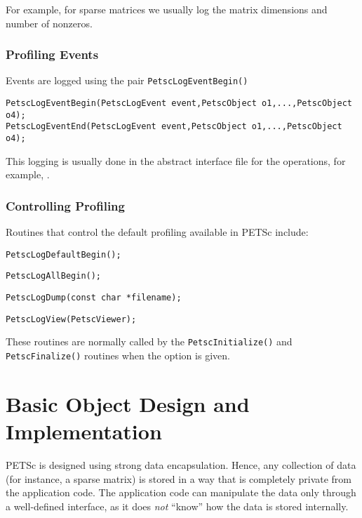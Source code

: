 For example, for sparse matrices we usually log the matrix
dimensions and number of nonzeros.

\subsection{Profiling Events}

Events are logged using the
pair \lstinline{PetscLogEventBegin()}
\begin{lstlisting}
PetscLogEventBegin(PetscLogEvent event,PetscObject o1,...,PetscObject o4);
PetscLogEventEnd(PetscLogEvent event,PetscObject o1,...,PetscObject o4);
\end{lstlisting}
This logging is usually done in the abstract
interface file for the operations, for example, \href{http://www.mcs.anl.gov/petsc/petsc-master/src/mat/interface/matrix.c.html}{}.

\subsection{Controlling Profiling}

Routines that control the default profiling available in PETSc include:
\begin{tightitemize}
  \item\lstinline{PetscLogDefaultBegin();}
  \item\lstinline{PetscLogAllBegin();}
  \item\lstinline{PetscLogDump(const char *filename);}
  \item\lstinline{PetscLogView(PetscViewer);}
\end{tightitemize}
These routines are normally called by the \lstinline{PetscInitialize()}
and \lstinline{PetscFinalize()} routines when the option
 is given.

\chapter{Basic Object Design and Implementation}
\label{chapter:design}

PETSc is designed using strong data encapsulation.  Hence,
any collection of data (for instance, a sparse matrix) is stored in
a way that is completely private from the application code. The application
code can manipulate the data only through a well-defined interface, as it
does {\em not} ``know'' how the data is stored internally.


